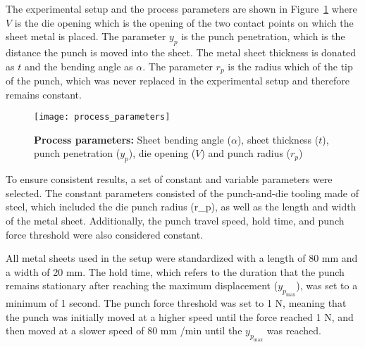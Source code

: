 The experimental setup and the process parameters are shown in
Figure~\ref{fig:process_parameters} where $V$ is the die opening which is the
opening of the two contact points on which the sheet metal is placed.
The parameter $y_p$ is the punch penetration, which is the distance the punch is moved
into the sheet.
The metal sheet thickness is donated as $t$ and the bending angle as $\alpha$.
The parameter $r_p$ is the radius which of the tip of the punch, which was never
replaced in the experimental setup and therefore remains constant.

\begin{figure}[h]
    \begin{tcolorbox}[arc=0pt,boxrule=0.5pt]
        \centering
        \texttt{[image: process\_parameters]}
        \caption{\textbf{Process parameters:} Sheet bending angle ($\alpha$), sheet
        thickness ($t$), punch
        penetration ($y_p$), die opening ($V$) and punch radius ($r_p$)}
        \label{fig:process_parameters}
    \end{tcolorbox}
\end{figure}


To ensure consistent results, a set of constant and variable parameters were selected.
The constant parameters consisted of the punch-and-die tooling made of steel, which
included the die punch radius (r_p), as well as the length and width of the
metal sheet. Additionally, the punch travel speed, hold time, and punch force threshold
were also considered constant.

All metal sheets used in the setup were standardized with a length of 80 mm and a width
of 20 mm.
The hold time, which refers to the duration that the punch remains stationary
after reaching the maximum displacement ($y_p_{\max}$), was set to a minimum of 1 second.
The punch force threshold was set to 1 N, meaning that the punch was initially moved at
a higher speed until the force reached 1 N, and then moved at a slower speed of 80 mm
/min until the $y_p_{\max}$ was reached.


